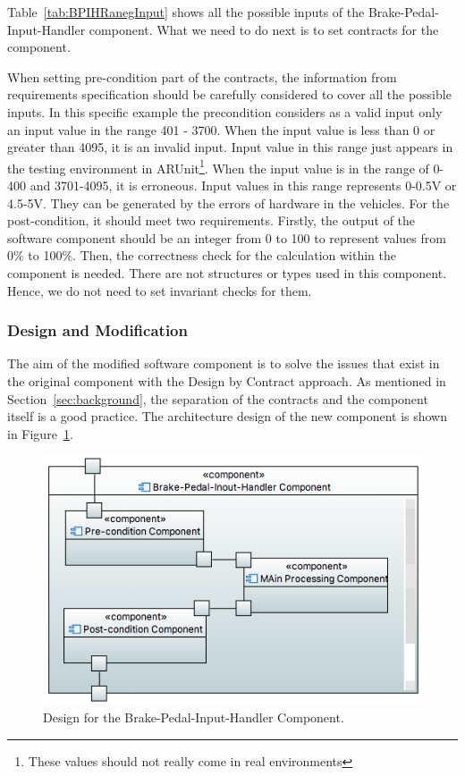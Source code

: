 Table~\ref{tab:BPIHRanegInput} shows all the possible inputs of the Brake-Pedal-Input-Handler component. What we need to do next is to set contracts for the component. %

When setting pre-condition part of the contracts, the information from requirements specification should be carefully considered to cover all the possible inputs. In this specific example the precondition considers as a valid input only an input value in the range 401 - 3700. 
When the input value is less than 0 or greater than 4095, it is an invalid input. Input value in this range just appears in the testing environment in ARUnit\footnote{These values should not really come in real environments}. When the input value is in the range of  0-400 and 3701-4095, it is erroneous. Input values in this range represents 0-0.5V or 4.5-5V. They can be generated by the errors of hardware in the vehicles. For the post-condition, it should meet two requirements. Firstly, the output of the software component should be an integer from 0 to 100 to represent values from 0\% to 100\%. Then, the correctness check for the calculation within the component is needed. There are not structures or types used in this component. Hence, we do not need to set invariant checks for them.


\subsubsection{Design and Modification}

The aim of the modified software component is to solve the issues that exist in the original component with the Design by Contract approach. As mentioned in Section~\ref{sec:background}, the separation of the contracts and the component itself is a good practice. The architecture design of the new component is shown in Figure~\ref{fig:BrakePedalComponent}. 

\begin{figure}[htb]
\centering
\includegraphics[width=.8\columnwidth]{figure/component222.png}
\caption{Design for the Brake-Pedal-Input-Handler Component.}
\label{fig:BrakePedalComponent}
\end{figure}

